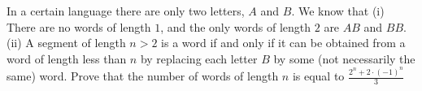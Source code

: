 In a certain language there are only two letters, $A$ and $B$. We know that
(i) There are no words of length $1$, and the only words of length $2$ are $AB$ and $BB$.
(ii) A segment of length $n > 2$ is a word if and only if it can be obtained from a word of length less than $n$ by replacing each letter $B$ by some (not necessarily the same) word.
Prove that the number of words of length $n$ is equal to $\frac{2^n +2\cdot (-1)^n}{3}$